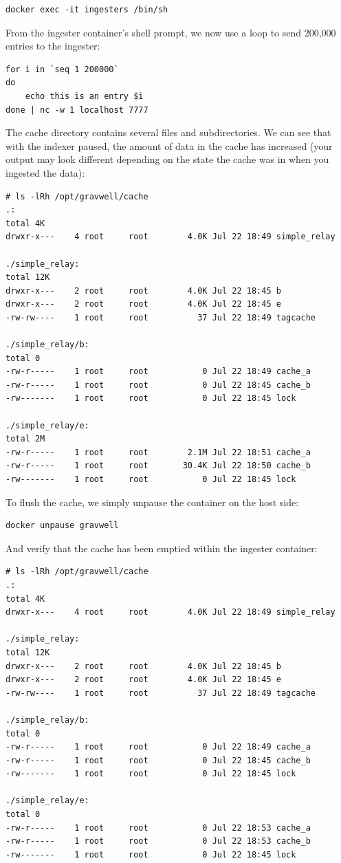\begin{Verbatim}[breaklines=true]
docker exec -it ingesters /bin/sh
\end{Verbatim}

From the ingester container's shell prompt, we now use a loop to
send 200,000 entries to the ingester:

\begin{Verbatim}[breaklines=true]
for i in `seq 1 200000`
do
	echo this is an entry $i
done | nc -w 1 localhost 7777
\end{Verbatim}

{The cache directory contains several files and subdirectories. We can see that
with the indexer paused, the amount of data in the cache has increased (your
output may look different depending on the state the cache was in when you
ingested the data):}

\begin{Verbatim}[breaklines=true]
# ls -lRh /opt/gravwell/cache
.:
total 4K     
drwxr-x---    4 root     root        4.0K Jul 22 18:49 simple_relay

./simple_relay:
total 12K    
drwxr-x---    2 root     root        4.0K Jul 22 18:45 b
drwxr-x---    2 root     root        4.0K Jul 22 18:45 e
-rw-rw----    1 root     root          37 Jul 22 18:49 tagcache

./simple_relay/b:
total 0      
-rw-r-----    1 root     root           0 Jul 22 18:49 cache_a
-rw-r-----    1 root     root           0 Jul 22 18:45 cache_b
-rw-------    1 root     root           0 Jul 22 18:45 lock

./simple_relay/e:
total 2M     
-rw-r-----    1 root     root        2.1M Jul 22 18:51 cache_a
-rw-r-----    1 root     root       30.4K Jul 22 18:50 cache_b
-rw-------    1 root     root           0 Jul 22 18:45 lock
\end{Verbatim}

To flush the cache, we simply unpause the container on the host side:

\begin{Verbatim}[breaklines=true]
docker unpause gravwell
\end{Verbatim}

And verify that the cache has been emptied within the ingester
container:

\begin{Verbatim}[breaklines=true]
# ls -lRh /opt/gravwell/cache
.:
total 4K
drwxr-x---    4 root     root        4.0K Jul 22 18:49 simple_relay

./simple_relay:
total 12K
drwxr-x---    2 root     root        4.0K Jul 22 18:45 b
drwxr-x---    2 root     root        4.0K Jul 22 18:45 e
-rw-rw----    1 root     root          37 Jul 22 18:49 tagcache

./simple_relay/b:
total 0
-rw-r-----    1 root     root           0 Jul 22 18:49 cache_a
-rw-r-----    1 root     root           0 Jul 22 18:45 cache_b
-rw-------    1 root     root           0 Jul 22 18:45 lock

./simple_relay/e:
total 0
-rw-r-----    1 root     root           0 Jul 22 18:53 cache_a
-rw-r-----    1 root     root           0 Jul 22 18:53 cache_b
-rw-------    1 root     root           0 Jul 22 18:45 lock
\end{Verbatim}

